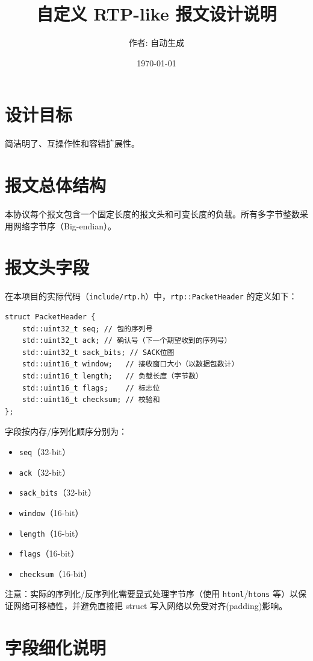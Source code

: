 \documentclass[11pt,a4paper]{article}
\title{自定义 RTP-like 报文设计说明}
\author{作者: 自动生成}
\date{\today}
\begin{document}
\maketitle

\section{设计目标}
简洁明了、互操作性和容错扩展性。

\section{报文总体结构}
本协议每个报文包含一个固定长度的报文头和可变长度的负载。所有多字节整数采用网络字节序（Big-endian）。

\section{报文头字段}
在本项目的实际代码（\texttt{include/rtp.h}）中，\texttt{rtp::PacketHeader} 的定义如下：

\begin{verbatim}
struct PacketHeader {
    std::uint32_t seq; // 包的序列号
    std::uint32_t ack; // 确认号（下一个期望收到的序列号）
    std::uint32_t sack_bits; // SACK位图
    std::uint16_t window;   // 接收窗口大小（以数据包数计）
    std::uint16_t length;   // 负载长度（字节数）
    std::uint16_t flags;    // 标志位
    std::uint16_t checksum; // 校验和
};
\end{verbatim}

字段按内存/序列化顺序分别为：
\begin{itemize}
  \item \texttt{seq}（32-bit）
  \item \texttt{ack}（32-bit）
  \item \texttt{sack\_bits}（32-bit）
  \item \texttt{window}（16-bit）
  \item \texttt{length}（16-bit）
  \item \texttt{flags}（16-bit）
  \item \texttt{checksum}（16-bit）
\end{itemize}

注意：实际的序列化/反序列化需要显式处理字节序（使用 \texttt{htonl}/\texttt{htons} 等）以保证网络可移植性，并避免直接把 struct 写入网络以免受对齐(padding)影响。

\section{字段细化说明}
\end{document}
